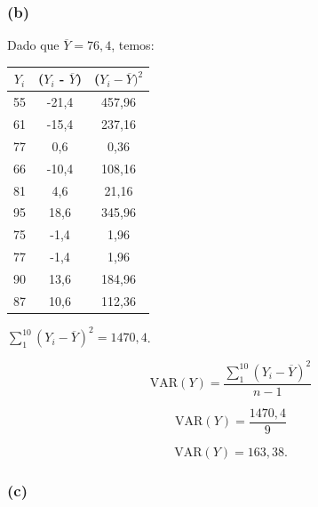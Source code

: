 \documentclass[hidelinks,11pt]{book}
\theoremstyle{definition}
\begin{document}
	\subsubsection{(b)}
Dado que $\overline{Y}= 76,4$, temos:
\begin{center}
	\begin{tabular}{|c|c|c|}\hline
		$Y_i$ & ($Y_i$ - $\overline{Y}$) &($Y_i - \overline{Y})^2$  \\\hline
		55  & -21,4 & 457,96 \\\hline
		61 & -15,4 & 237,16 \\\hline
		77 & 0,6 & 0,36 \\\hline
		66 & -10,4 & 108,16 \\\hline
		81 & 4,6 & 21,16 \\\hline
		95 & 18,6 & 345,96 \\\hline
		75 & -1,4 & 1,96 \\\hline
		77 & -1,4 & 1,96 \\\hline
		90 & 13,6 & 184,96 \\\hline
		87 & 10,6 & 112,36 \\\hline 
	\end{tabular}
\end{center}



$\sum_{1}^{10} (Y_i - \overline{Y})^2 = 1470,4$. 


\begin{displaymath}
	\textrm{VAR}(Y) = \frac{\sum_{1}^{10} (Y_i - \overline{Y})^2 }{n-1}
\end{displaymath}

\begin{displaymath}
	\textrm{VAR}(Y) = \frac{1470,4}{9}
\end{displaymath}

\begin{displaymath}
	\textrm{VAR}(Y) =163,38.
\end{displaymath}



\subsubsection{(c)}
\end{document}
